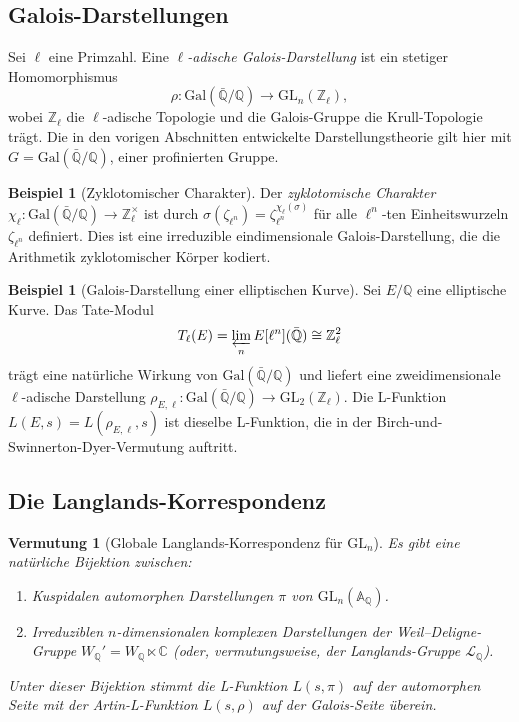 \documentclass[12pt,a4paper]{amsart}
\newtheorem{vermutung}[theorem]{Vermutung}
\theoremstyle{definition}
\newtheorem{beispiel}[theorem]{Beispiel}
\begin{document}
\subsection{Galois-Darstellungen}

Sei $\ell$ eine Primzahl.  Eine \emph{$\ell$-adische Galois-Darstellung} ist
ein stetiger Homomorphismus
\[
    \rho \colon \mathrm{Gal}(\bar{\mathbb{Q}}/\mathbb{Q}) \longrightarrow \mathrm{GL}_n(\mathbb{Z}_\ell),
\]
wobei $\mathbb{Z}_\ell$ die $\ell$-adische Topologie und die Galois-Gruppe die
Krull-Topologie trägt.  Die in den vorigen Abschnitten entwickelte
Darstellungstheorie gilt hier mit $G = \mathrm{Gal}(\bar{\mathbb{Q}}/\mathbb{Q})$,
einer profinierten Gruppe.

\begin{beispiel}[Zyklotomischer Charakter]
Der \emph{zyklotomische Charakter} $\chi_\ell \colon
\mathrm{Gal}(\bar{\mathbb{Q}}/\mathbb{Q}) \to \mathbb{Z}_\ell^\times$ ist durch
$\sigma(\zeta_{\ell^n}) = \zeta_{\ell^n}^{\chi_\ell(\sigma)}$ für alle
$\ell^n$-ten Einheitswurzeln $\zeta_{\ell^n}$ definiert.  Dies ist eine
irreduzible eindimensionale Galois-Darstellung, die die Arithmetik
zyklotomischer Körper kodiert.
\end{beispiel}

\begin{beispiel}[Galois-Darstellung einer elliptischen Kurve]
Sei $E/\mathbb{Q}$ eine elliptische Kurve.  Das Tate-Modul
\[
    T_\ell(E) = \varprojlim_n E[\ell^n](\bar{\mathbb{Q}}) \cong \mathbb{Z}_\ell^2
\]
trägt eine natürliche Wirkung von $\mathrm{Gal}(\bar{\mathbb{Q}}/\mathbb{Q})$
und liefert eine zweidimensionale $\ell$-adische Darstellung
$\rho_{E,\ell} \colon \mathrm{Gal}(\bar{\mathbb{Q}}/\mathbb{Q}) \to \mathrm{GL}_2(\mathbb{Z}_\ell)$.
Die L-Funktion $L(E,s) = L(\rho_{E,\ell}, s)$ ist dieselbe L-Funktion, die in
der Birch-und-Swinnerton-Dyer-Vermutung auftritt.
\end{beispiel}

\subsection{Die Langlands-Korrespondenz}

\begin{vermutung}[Globale Langlands-Korrespondenz für $\mathrm{GL}_n$]
\label{verm:langlands}
Es gibt eine natürliche Bijektion zwischen:
\begin{enumerate}[label=\textup{(\roman*)}]
  \item Kuspidalen automorphen Darstellungen $\pi$ von $\mathrm{GL}_n(\mathbb{A}_{\mathbb{Q}})$.
  \item Irreduziblen $n$-dimensionalen komplexen Darstellungen der
        Weil--Deligne-Gruppe $W_{\mathbb{Q}}' = W_{\mathbb{Q}} \ltimes \mathbb{C}$
        (oder, vermutungsweise, der Langlands-Gruppe $\mathcal{L}_{\mathbb{Q}}$).
\end{enumerate}
Unter dieser Bijektion stimmt die L-Funktion $L(s,\pi)$ auf der automorphen Seite
mit der Artin-L-Funktion $L(s,\rho)$ auf der Galois-Seite überein.
\end{vermutung}
\end{document}
